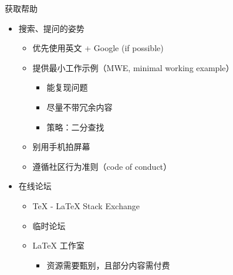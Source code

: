 \begin{frame}{获取帮助}
  \begin{itemize}
    \item<+-> 搜索、提问的姿势
  
      \begin{itemize}
        \item 优先使用英文 + Google (if possible)
        \item 提供最小工作示例（MWE, minimal working example）
          \begin{itemize}
            \item 能复现问题
            \item 尽量不带冗余内容
            \item 策略：二分查找
          \end{itemize}
        \item 别用手机拍屏幕
        \item 遵循社区行为准则（code of conduct）
      \end{itemize}
  
    \item<+-> 在线论坛
  
      \begin{itemize}
        \item \TeX{} - \LaTeX{} Stack Exchange 
        \item \CTeX{} 临时论坛 
        \item \LaTeX{} 工作室 
          \begin{itemize}
            \item 资源需要甄别，且部分内容需付费
          \end{itemize}
      \end{itemize}
  \end{itemize}
\end{frame}

